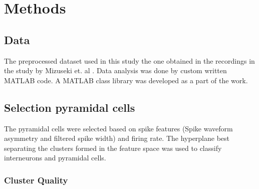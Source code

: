 \chapter{Methods}
\label{analysis}

\section{Data}
The preprocessed dataset used in this study the one obtained in the recordings in the study by Mizuseki et. al \cite{Mizuseki2012}. Data analysis was done by custom written MATLAB code. A MATLAB class library was developed as a part of the work. 

\section{Selection pyramidal cells}
The pyramidal cells were selected based on spike features (Spike waveform asymmetry and filtered spike width) \cite{Sirota2008} and firing rate. The hyperplane best separating the clusters formed in the feature space was used to classify interneurons and pyramidal cells.

\subsection{Cluster Quality}

